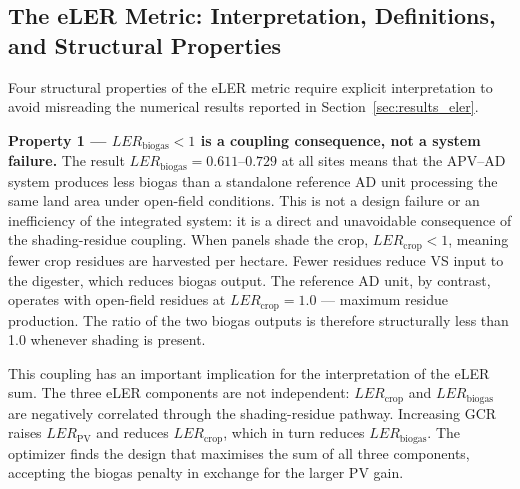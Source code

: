 \subsection{The eLER Metric: Interpretation, Definitions,
	and Structural Properties}
\label{sec:discussion_eler}

\hspace{1cm}Four structural properties of the eLER metric require
explicit interpretation to avoid misreading the numerical results
reported in Section~\ref{sec:results_eler}.

\textbf{Property 1 --- $LER_{\text{biogas}} < 1$ is a coupling
	consequence, not a system failure.}
The result $LER_{\text{biogas}} = 0.611$--$0.729$ at all sites
means that the APV--AD system produces less biogas than a standalone
reference AD unit processing the same land area under open-field
conditions. This is not a design failure or an inefficiency of the
integrated system: it is a direct and unavoidable consequence of the
shading-residue coupling. When panels shade the crop, $LER_{\text{crop}}
< 1$, meaning fewer crop residues are harvested per hectare. Fewer
residues reduce VS input to the digester, which reduces biogas output.
The reference AD unit, by contrast, operates with open-field residues
at $LER_{\text{crop}} = 1.0$ --- maximum residue production.
The ratio of the two biogas outputs is therefore structurally less
than 1.0 whenever shading is present.

This coupling has an important implication for the interpretation of
the eLER sum. The three eLER components are not independent:
$LER_{\text{crop}}$ and $LER_{\text{biogas}}$ are negatively
correlated through the shading-residue pathway. Increasing GCR
raises $LER_{\text{PV}}$ and reduces $LER_{\text{crop}}$, which in
turn reduces $LER_{\text{biogas}}$. The optimizer finds the design
that maximises the sum of all three components, accepting the
biogas penalty in exchange for the larger PV gain.

